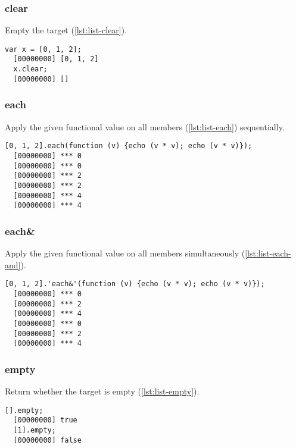\subsubsection{clear}

Empty the target (\autoref{lst:list-clear}).

\begin{lstlisting}[caption=List.clear, label=lst:list-clear, float=\floatposh]
  var x = [0, 1, 2];
  [00000000] [0, 1, 2]
  x.clear;
  [00000000] []
\end{lstlisting}

\subsubsection{each}

Apply the given functional value on all members (\autoref{lst:list-each})
sequentially.

\begin{lstlisting}[caption=List.each, label=lst:list-each, float=\floatposh]
  [0, 1, 2].each(function (v) {echo (v * v); echo (v * v)});
  [00000000] *** 0
  [00000000] *** 0
  [00000000] *** 2
  [00000000] *** 2
  [00000000] *** 4
  [00000000] *** 4
\end{lstlisting}

\subsubsection{each\&}

Apply the given functional value on all members simultaneously
(\autoref{lst:list-each-and}).

\begin{lstlisting}[caption=List.each, label=lst:list-each-and, float=\floatposh]
  [0, 1, 2].'each&'(function (v) {echo (v * v); echo (v * v)});
  [00000000] *** 0
  [00000000] *** 2
  [00000000] *** 4
  [00000000] *** 0
  [00000000] *** 2
  [00000000] *** 4
\end{lstlisting}

\subsubsection{empty}

Return whether the target is empty (\autoref{lst:list-empty}).

\begin{lstlisting}[caption=List.empty, label=lst:list-empty, float=\floatposh]
  [].empty;
  [00000000] true
  [1].empty;
  [00000000] false
\end{lstlisting}

